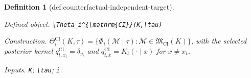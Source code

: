 \documentclass{article}
\newtheorem{definition}{Definition}
\begin{document}
\begin{definition}[def:counterfactual-independent-target]\label{def:counterfactual-independent-target}
\par\smallskip\noindent\emph{Defined object.} \texttt{\textbackslash{}\allowbreak{}Theta\_\allowbreak{}i\textasciicircum{}\{\textbackslash{}\allowbreak{}mathrm\{CI\}\allowbreak{}\}\allowbreak{}(K,\allowbreak{}\textbackslash{}\allowbreak{}tau)}
\par\smallskip\noindent\emph{Construction.} \(\Theta_i^{\mathrm{CI}}(K,\tau)=\{\Phi_i(\mathcal M\mid\tau):\mathcal M\in\mathfrak M_{\mathrm{CI}}(K)\}\), with the selected posterior kernel \(q_{t,x_t}^{\mathrm{CI}}=\delta_{y_t}\) and \(q_{t,x}^{\mathrm{CI}}=K_t(\cdot\mid x)\) for \(x\ne x_t\).
\par\smallskip\noindent\emph{Inputs.} \texttt{K}; \texttt{\textbackslash{}\allowbreak{}tau}; \texttt{i}.
\end{definition}
\end{document}
